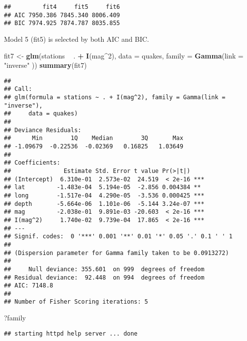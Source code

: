 \documentclass[
]{article}
\newenvironment{Shaded}{\begin{snugshade}}{\end{snugshade}}
\newcommand{\DataTypeTok}[1]{\textcolor[rgb]{0.13,0.29,0.53}{#1}}
\newcommand{\DecValTok}[1]{\textcolor[rgb]{0.00,0.00,0.81}{#1}}
\newcommand{\KeywordTok}[1]{\textcolor[rgb]{0.13,0.29,0.53}{\textbf{#1}}}
\newcommand{\NormalTok}[1]{#1}
\newcommand{\OperatorTok}[1]{\textcolor[rgb]{0.81,0.36,0.00}{\textbf{#1}}}
\newcommand{\StringTok}[1]{\textcolor[rgb]{0.31,0.60,0.02}{#1}}
\begin{document}
\begin{verbatim}
##         fit4     fit5     fit6
## AIC 7950.386 7845.340 8006.409
## BIC 7974.925 7874.787 8035.855
\end{verbatim}

Model 5 (fit5) is selected by both AIC and BIC.

\begin{Shaded}
\begin{Highlighting}[]
\NormalTok{fit7 <-}\StringTok{ }\KeywordTok{glm}\NormalTok{(stations }\OperatorTok{~}\StringTok{ }\NormalTok{. }\OperatorTok{+}\StringTok{ }\KeywordTok{I}\NormalTok{(mag}\OperatorTok{^}\DecValTok{2}\NormalTok{), }\DataTypeTok{data =}\NormalTok{ quakes, }\DataTypeTok{family =} \KeywordTok{Gamma}\NormalTok{(}\DataTypeTok{link =} \StringTok{"inverse"}\NormalTok{ ))}
\KeywordTok{summary}\NormalTok{(fit7)}
\end{Highlighting}
\end{Shaded}

\begin{verbatim}
## 
## Call:
## glm(formula = stations ~ . + I(mag^2), family = Gamma(link = "inverse"), 
##     data = quakes)
## 
## Deviance Residuals: 
##      Min        1Q    Median        3Q       Max  
## -1.09679  -0.22536  -0.02369   0.16825   1.03649  
## 
## Coefficients:
##               Estimate Std. Error t value Pr(>|t|)    
## (Intercept)  6.310e-01  2.573e-02  24.519  < 2e-16 ***
## lat         -1.483e-04  5.194e-05  -2.856 0.004384 ** 
## long        -1.517e-04  4.290e-05  -3.536 0.000425 ***
## depth       -5.664e-06  1.101e-06  -5.144 3.24e-07 ***
## mag         -2.038e-01  9.891e-03 -20.603  < 2e-16 ***
## I(mag^2)     1.740e-02  9.739e-04  17.865  < 2e-16 ***
## ---
## Signif. codes:  0 '***' 0.001 '**' 0.01 '*' 0.05 '.' 0.1 ' ' 1
## 
## (Dispersion parameter for Gamma family taken to be 0.0913272)
## 
##     Null deviance: 355.601  on 999  degrees of freedom
## Residual deviance:  92.448  on 994  degrees of freedom
## AIC: 7148.8
## 
## Number of Fisher Scoring iterations: 5
\end{verbatim}

\begin{Shaded}
\begin{Highlighting}[]
\NormalTok{?family}
\end{Highlighting}
\end{Shaded}

\begin{verbatim}
## starting httpd help server ... done
\end{verbatim}
\end{document}

